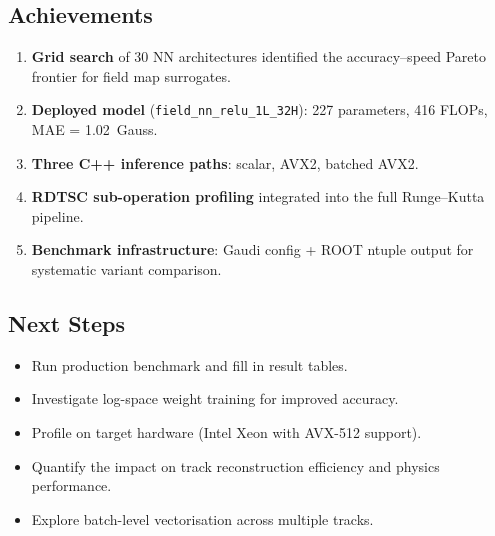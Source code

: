 \documentclass[11pt,a4paper]{article}
\begin{document}
\subsection{Achievements}

\begin{enumerate}
  \item \textbf{Grid search} of 30 NN architectures identified the
        accuracy--speed Pareto frontier for field map surrogates.
  \item \textbf{Deployed model} (\texttt{field\_nn\_relu\_1L\_32H}):
        227 parameters, 416 FLOPs, MAE = 1.02~Gauss.
  \item \textbf{Three C++ inference paths}: scalar, AVX2, batched AVX2.
  \item \textbf{RDTSC sub-operation profiling} integrated into the full
        Runge--Kutta pipeline.
  \item \textbf{Benchmark infrastructure}: Gaudi config + ROOT ntuple output
        for systematic variant comparison.
\end{enumerate}

\subsection{Next Steps}

\begin{itemize}[nosep]
  \item Run production benchmark and fill in result tables.
  \item Investigate log-space weight training for improved accuracy.
  \item Profile on target hardware (Intel Xeon with AVX-512 support).
  \item Quantify the impact on track reconstruction efficiency and
        physics performance.
  \item Explore batch-level vectorisation across multiple tracks.
\end{itemize}

\end{document}
